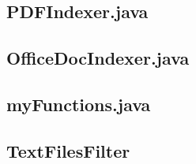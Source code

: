 \subsection{PDFIndexer.java}
\label{subsec:PDFIndexer.java}

\lstset{language=java, mathescape=true}


\subsection{OfficeDocIndexer.java}
\label{subsec:OfficeDocIndexer.java}

\lstset{language=java, mathescape=true}



\subsection{myFunctions.java}
\label{subsec:myFunctions.java}

\lstset{language=java, mathescape=true}


\subsection{TextFilesFilter}
\label{subsec:TextFilesFilter.java}

\lstset{language=java, mathescape=true}

